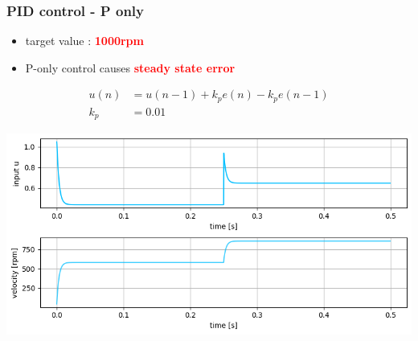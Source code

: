 \documentclass{beamer}
\begin{document}
\begin{frame}
  
  \frametitle{\textbf { PID control - P only}}

  \begin{itemize}
    \item  target value : \textcolor{red}{\textbf { 1000rpm}}
    \item  P-only control causes \textcolor{red}{\textbf { steady state error}}
  \end{itemize}
  
 
  \begin{align*}
    u(n)   &= u(n-1) + k_pe(n) - k_pe(n-1) \\
    k_p    &= 0.01
  \end{align*}

  {\centering \includegraphics[scale=0.4]{../images/motor_control/pid_p_control.png}}

\end{frame}
\end{document}

